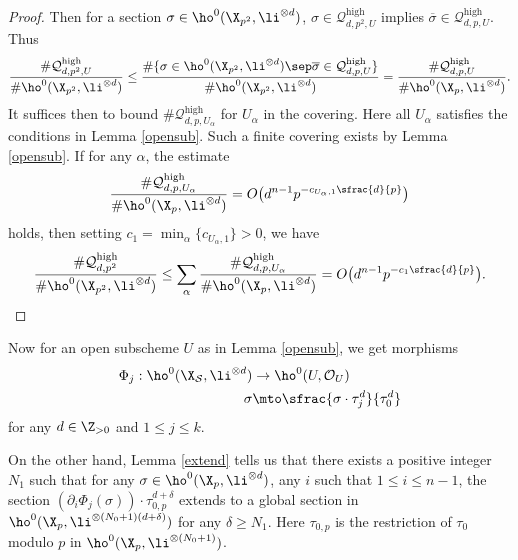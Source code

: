 \begin{proof}[Proof]
Then for a section $\sigma\in \ho^0(\X_{p^2}, \li^{\otimes d})$, $\sigma \in \mathcal{Q}^{\mathrm{high}}_{d,p^2,U}$ implies $\overline{\sigma}\in \mathcal{Q}^{\mathrm{high}}_{d,p,U}$. Thus
\[
\frac{\#\mathcal{Q}_{d,p^2,U}^{\mathrm{high}}}{\#\ho^0(\X_{p^2}, \li^{\otimes d})}\leq \frac{\#\{ \sigma\in \ho^0(\X_{p^2}, \li^{\otimes d})\sep \overline{\sigma}\in \mathcal{Q}^{\mathrm{high}}_{d,p,U} \} }{\#\ho^0(\X_{p^2}, \li^{\otimes d})} = \frac{\#\mathcal{Q}_{d,p,U}^{\mathrm{high}}}{\#\ho^0(\X_{p}, \li^{\otimes d})}.
\]
It suffices then to bound $\#\mathcal{Q}_{d,p,U_{\alpha}}^{\mathrm{high}}$ for $U_{\alpha}$ in the covering. Here all $U_{\alpha}$ satisfies the conditions in Lemma \ref{opensub}. Such a finite covering exists by Lemma \ref{opensub}. If for any $\alpha$, the estimate\vspace*{-3pt}
\[
\frac{\#\mathcal{Q}_{d,p,U_{\alpha}}^{\mathrm{high}}}{\#\ho^0(\X_{p}, \li^{\otimes d})}=O\bigl(d^{n-1}p^{-c_{U_{\alpha},1}\sfrac{d}{p}} \bigr)
\]
holds, then setting $c_1=\min_{\alpha}\{ c_{U_{\alpha},1} \}>0$, we have\vspace*{-3pt}
\[
\frac{\#\mathcal{Q}_{d,p^2}^{\mathrm{high}}}{\#\ho^0(\X_{p^2}, \li^{\otimes d})}\leq \sum_{\alpha}\frac{\#\mathcal{Q}_{d,p,U_{\alpha}}^{\mathrm{high}}}{\#\ho^0(\X_{p}, \li^{\otimes d})}=O\bigl(d^{n-1}p^{-c_1\sfrac{d}{p}} \bigr).\qedhere
\]
\end{proof}

Now for an open subscheme $U$ as in Lemma \ref{opensub}, we get morphisms
\begin{align*}
\Phi_j: \ho^0(\X_{\mathcal{S}}, \li^{\otimes d}) &\to \ho^0(U, \mathcal{O}_U) \\
\sigma &\mto \sfrac{\sigma\cdot \tau_j^d}{\tau_0^d}
\end{align*}
for any $d\in \Z_{>0}$ and $1\leq j\leq k$.

On the other hand, Lemma \ref{extend} tells us that there exists a positive integer $N_1$ such that for any $\sigma \in \ho^0(\X_{p}, \li^{\otimes d})$, any $i$ such that $1\leq i\leq n-1$, the section $\left(\partial_i \Phi_j(\sigma) \right)\cdot \tau_{0,p}^{d+\delta}$ extends to a global section in $\ho^0(\X_{p}, \li^{\otimes (N_0+1)(d+\delta)})$ for any $\delta \geq N_1$. Here $\tau_{0,p}$ is the restriction of $\tau_0$ modulo $p$ in $\ho^0(\X_p, \li^{\otimes (N_0+1)})$.

